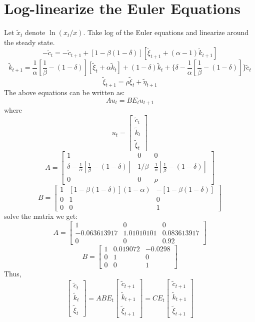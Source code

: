 \documentclass{article}
\begin{document}
\section{Log-linearize the Euler Equations}
Let $\tilde x_t$ denote $\ln (x_t/x)$. Take log of the Euler equations and linearize around the steady state.
$$ -\tilde c_t = -\tilde c_{t+1}+[1-\beta(1-\delta)][\tilde \xi_{t+1} + (\alpha-1)\tilde k_{t+1}]$$
$$ \tilde k_{t+1}=\frac{1}{\alpha}[\frac{1}{\beta}-(1-\delta)][\tilde \xi_t+\alpha \tilde k_t]+(1-\delta)\tilde k_t+ \{ \delta-\frac{1}{\alpha}[\frac{1}{\beta}-(1-\delta)] \} \tilde c_t$$
$$ \tilde \xi_{t+1}=\rho \tilde \xi_t + \tilde \eta_{t+1}$$
The above equations can be written as:
$$Au_t=BE_t u_{t+1}$$
where
$$u_t= \left[\begin{array}{c} \tilde c_{t} \\ \tilde k_{t} \\ \tilde \xi_{t} \end{array}\right] $$
$$A= \left[\begin{array}{ccc} 1 & 0 & 0 \\ \delta-\frac{1}{\alpha}[\frac{1}{\beta}-(1-\delta)] & 1/\beta & \frac{1}{\alpha}[\frac{1}{\beta}-(1-\delta)] \\
0 & 0 & \rho \end{array}\right]$$
$$B= \left[\begin{array}{ccc} 1 & [1-\beta(1-\delta)](1-\alpha) & -[1-\beta(1-\delta)] \\ 0 & 1 & 0 \\ 0 & 0 & 1 \end{array}\right]$$
solve the matrix we get:
$$A=\left[\begin{array}{ccc} 1 & 0 & 0 \\
-0.063613917 & 1.01010101 & 0.083613917 \\
0 & 0 & 0.92 \end{array}\right]$$
$$B=\left[\begin{array}{ccc} 1 & 0.019072 & -0.0298 \\ 0 & 1 & 0 \\ 0 & 0 & 1 \end{array}\right]$$
Thus,
\begin{equation}
    \left[\begin{array}{c} \tilde c_{t} \\ \tilde k_{t} \\ \tilde \xi_{t} \end{array}\right] = ABE_t
    \left[\begin{array}{c} \tilde c_{t+1} \\ \tilde k_{t+1} \\ \tilde \xi_{t+1} \end{array}\right]
     = CE_t\left[\begin{array}{c} \tilde c_{t+1} \\ \tilde k_{t+1} \\ \tilde \xi_{t+1} \end{array}\right]
\end{equation}
\end{document}

